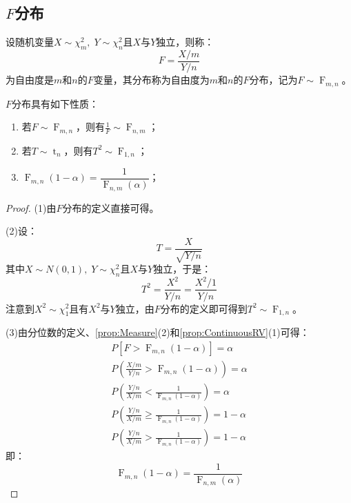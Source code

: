 \subsection{$F$分布}
\begin{definition}
	设随机变量$X\sim \chi_m^2,\;Y\sim\chi_n^2$且$X$与$Y$独立，则称：
	\begin{equation*}
		F=\frac{X/m}{Y/n}
	\end{equation*}
	为自由度是$m$和$n$的$F$变量，其分布称为自由度为$m$和$n$的$F$分布，记为$F\sim \operatorname{F}_{m,n}$。
\end{definition}
\begin{property}\label{prop:FDistribution}
	$F$分布具有如下性质：
	\begin{enumerate}
		\item 若$F\sim \operatorname{F}_{m,n}$，则有$\frac{1}{F}\sim \operatorname{F}_{n,m}$；
		\item 若$T\sim \operatorname{t}_n$，则有$T^2\sim \operatorname{F}_{1,n}$；
		\item $\operatorname{F}_{m,n}(1-\alpha)=\dfrac{1}{\operatorname{F}_{n,m}(\alpha)}$；
	\end{enumerate}
\end{property}
\begin{proof}
	(1)由$F$分布的定义直接可得。\par
	(2)设：
	\begin{equation*}
		T=\frac{X}{\sqrt{Y/n}}
	\end{equation*}
	其中$X\sim N(0,1),\;Y\sim\chi_n^2$且$X$与$Y$独立，于是：
	\begin{equation*}
		T^2=\frac{X^2}{Y/n}=\frac{X^2/1}{Y/n}
	\end{equation*}
	注意到$X^2\sim\chi_1^2$且有$X^2$与$Y$独立，由$F$分布的定义即可得到$T^2\sim \operatorname{F}_{1,n}$。\par
	(3)由分位数的定义、\cref{prop:Measure}(2)和\cref{prop:ContinuousRV}(1)可得：
	\begin{gather*}
		P[F>\operatorname{F}_{m,n}(1-\alpha)]=\alpha \\
		P\left(\frac{X/m}{Y/n}>\operatorname{F}_{m,n}(1-\alpha)\right)=\alpha \\
		P\left(\frac{Y/n}{X/m}<\frac{1}{\operatorname{F}_{m,n}(1-\alpha)}\right)=\alpha \\
		P\left(\frac{Y/n}{X/m}\geqslant\frac{1}{\operatorname{F}_{m,n}(1-\alpha)}\right)=1-\alpha \\
		P\left(\frac{Y/n}{X/m}>\frac{1}{\operatorname{F}_{m,n}(1-\alpha)}\right)=1-\alpha
	\end{gather*}
	即：
	\begin{equation*}
		\operatorname{F}_{m,n}(1-\alpha)=\frac{1}{\operatorname{F}_{n,m}(\alpha)}
	\end{equation*}
\end{proof}


